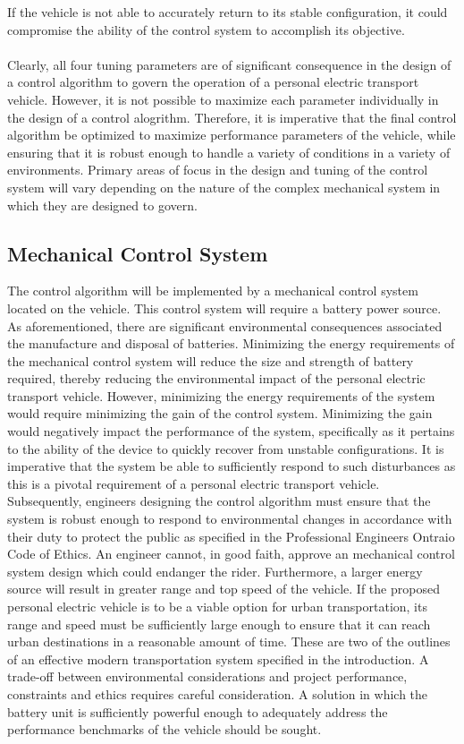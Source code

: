 If the vehicle is not able to accurately return to its stable configuration, it could compromise the ability of the control system to accomplish its objective.
\\
\\
Clearly, all four tuning parameters are of significant consequence in the design of a control algorithm to govern the operation of a personal electric transport vehicle. 
However, it is not possible to maximize each parameter individually in the design of a control alogrithm. 
Therefore, it is imperative that the final control algorithm be optimized to maximize performance parameters of the vehicle, while ensuring that it is robust enough to handle a variety of conditions in a variety of environments. 
Primary areas of focus in the design and tuning of the control system will vary depending on the nature of the complex mechanical system in which they are designed to govern.

\subsection{Mechanical Control System}
The control algorithm will be implemented by a mechanical control system located on the vehicle. 
This control system will require a battery power source.
As aforementioned, there are significant environmental consequences associated the manufacture and disposal of batteries. 
Minimizing the energy requirements of the mechanical control system will reduce the size and strength of battery required, thereby reducing the environmental impact of the personal electric transport vehicle.  
However, minimizing the energy requirements of the system would require minimizing the gain of the control system. 
Minimizing the gain would negatively impact the performance of the system, specifically as it pertains to the ability of the device to quickly recover from unstable configurations. 
It is imperative that the system be able to sufficiently respond to such disturbances as this is a pivotal requirement of a personal electric transport vehicle. 
Subsequently, engineers designing the control algorithm must ensure that the system is robust enough to respond to environmental changes in accordance with their duty to protect the public as specified in the Professional Engineers Ontraio Code of Ethics. 
An engineer cannot, in good faith, approve an mechanical control system design which could endanger the rider. 
Furthermore, a larger energy source will result in greater range and top speed of the vehicle. 
If the proposed personal electric vehicle is to be a viable option for urban transportation, its range and speed must be sufficiently large enough to ensure that it can reach urban destinations in a reasonable amount of time.
These are two of the outlines of an effective modern transportation system specified in the introduction. 
A trade-off between environmental considerations and project performance, constraints and ethics requires careful consideration. 
A solution in which the battery unit is sufficiently powerful enough to adequately address the performance benchmarks of the vehicle should be sought. 